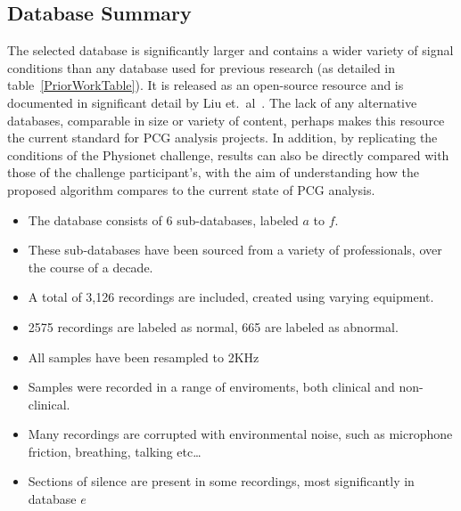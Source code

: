 \documentclass[titlepage, 12pt]{scrartcl} \usepackage{enumitem}
\begin{document}
\subsection{Database Summary}
The selected database is significantly larger and contains a wider variety of
signal conditions than any database used for previous research (as detailed in
table~\ref{PriorWorkTable}). It is released as an open-source resource and is
documented in significant detail by Liu et.\ al~\parencite{Liu2016}. The lack
of any alternative databases, comparable in size or variety of content, perhaps
makes this resource the current standard for PCG analysis projects. In
addition, by replicating the conditions of the Physionet challenge, results can
also be directly compared with those of the challenge participant's, with the
aim of understanding how the proposed algorithm compares to the current state
of PCG analysis.

\begin{itemize}
    \item The database consists of 6 sub-databases, labeled $a$ to $f$.
    \item These sub-databases have been sourced from a variety of professionals,
        over the course of a decade.
    \item A total of 3,126 recordings are included, created using varying equipment.
    \item 2575 recordings are labeled as normal, 665 are labeled as abnormal.
    \item All samples have been resampled to 2KHz
    \item Samples were recorded in a range of enviroments, both clinical and
        non-clinical.
    \item Many recordings are corrupted with environmental noise, such as
        microphone friction, breathing, talking etc\ldots
    \item Sections of silence are present in some recordings, most
        significantly in database $e$
\end{itemize}
\end{document}
